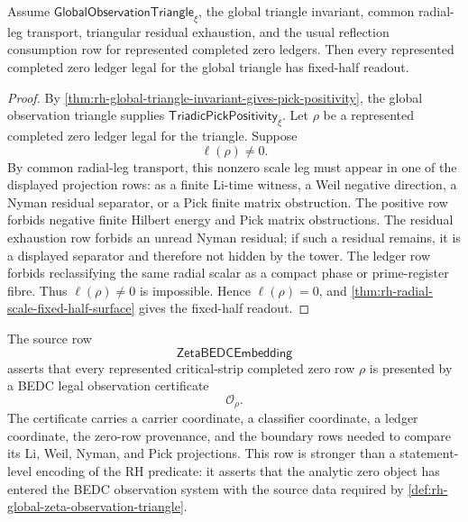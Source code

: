 \begin{theorem}
\label{thm:rh-global-observation-triangle-fixed-half-readout}
Assume $\mathsf{GlobalObservationTriangle}_{\xi}$, the global triangle
invariant, common radial-leg transport, triangular residual exhaustion,
and the usual reflection consumption row for represented completed zero
ledgers.  Then every represented completed zero ledger legal for the
global triangle has fixed-half readout.
\end{theorem}

\begin{proof}
By
\autoref{thm:rh-global-triangle-invariant-gives-pick-positivity},
the global observation triangle supplies
$\mathsf{TriadicPickPositivity}_{\xi}$.  Let $\rho$ be a represented
completed zero ledger legal for the triangle.  Suppose
$$
\ell(\rho)\ne0.
$$
By common radial-leg transport, this nonzero scale leg must appear in
one of the displayed projection rows: as a finite Li-time witness, a
Weil negative direction, a Nyman residual separator, or a Pick finite
matrix obstruction.  The positive row forbids negative finite Hilbert
energy and Pick matrix obstructions.  The residual exhaustion row
forbids an unread Nyman residual; if such a residual remains, it is a
displayed separator and therefore not hidden by the tower.  The ledger
row forbids reclassifying the same radial scalar as a compact phase or
prime-register fibre.  Thus $\ell(\rho)\ne0$ is impossible.  Hence
$\ell(\rho)=0$, and
\autoref{thm:rh-radial-scale-fixed-half-surface} gives the fixed-half
readout.
\end{proof}

\begin{definition}
\label{def:rh-zeta-bedc-embedding-row}
The source row
$$
\mathsf{ZetaBEDCEmbedding}
$$
asserts that every represented critical-strip completed zero row
$\rho$ is presented by a BEDC legal observation certificate
$$
\mathcal O_\rho.
$$
The certificate carries a carrier coordinate, a classifier coordinate,
a ledger coordinate, the zero-row provenance, and the boundary rows
needed to compare its Li, Weil, Nyman, and Pick projections.  This row
is stronger than a statement-level encoding of the RH predicate: it
asserts that the analytic zero object has entered the BEDC observation
system with the source data required by
\autoref{def:rh-global-zeta-observation-triangle}.
\end{definition}

